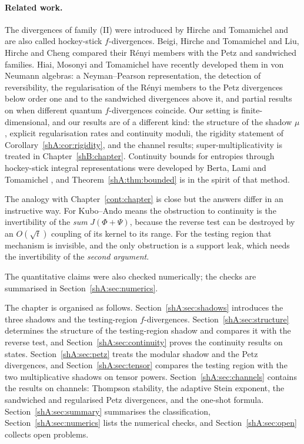 \paragraph{Related work.} The divergences of family (II) were introduced by Hirche and Tomamichel \cite{HircheTomamichel2024} and are also called hockey-stick $f$-divergences. Beigi, Hirche and Tomamichel \cite{BeigiHircheTomamichel2025} and Liu, Hirche and Cheng \cite{LiuHircheCheng2025} compared their R\'enyi members with the Petz and sandwiched families. Hiai, Mosonyi and Tomamichel \cite{HMT2026} have recently developed them in von Neumann algebras: a Neyman--Pearson representation, the detection of reversibility, the regularisation of the R\'enyi members to the Petz divergences below order one and to the sandwiched divergences above it, and partial results on when different quantum $f$-divergences coincide. Our setting is finite-dimensional, and our results are of a different kind: the structure of the shadow $\mu$, explicit regularisation rates and continuity moduli, the rigidity statement of Corollary~\ref{shA:cor:rigidity}, and the channel results; super-multiplicativity is treated in Chapter~\ref{shB:chapter}. Continuity bounds for entropies through hockey-stick integral representations were developed by Berta, Lami and Tomamichel \cite{BLT2024}, and Theorem~\ref{shA:thm:bounded} is in the spirit of that method.

The analogy with Chapter~\ref{cont:chapter} is close but the answers differ in an instructive way. For Kubo--Ando means the obstruction to continuity is the invertibility of the \emph{sum} $J(\Phi+\Psi)$, because the reverse test can be destroyed by an $O(\sqrt t)$ coupling of its kernel to its range. For the testing region that mechanism is invisible, and the only obstruction is a support leak, which needs the invertibility of the \emph{second argument}.

The quantitative claims were also checked numerically; the checks are summarised in Section~\ref{shA:sec:numerics}.

The chapter is organised as follows. Section~\ref{shA:sec:shadows} introduces the three shadows and the testing-region $f$-divergences. Section~\ref{shA:sec:structure} determines the structure of the testing-region shadow and compares it with the reverse test, and Section~\ref{shA:sec:continuity} proves the continuity results on states. Section~\ref{shA:sec:petz} treats the modular shadow and the Petz divergences, and Section~\ref{shA:sec:tensor} compares the testing region with the two multiplicative shadows on tensor powers. Section~\ref{shA:sec:channels} contains the results on channels: Thompson stability, the adaptive Stein exponent, the sandwiched and regularised Petz divergences, and the one-shot formula. Section~\ref{shA:sec:summary} summarises the classification, Section~\ref{shA:sec:numerics} lists the numerical checks, and Section~\ref{shA:sec:open} collects open problems.


